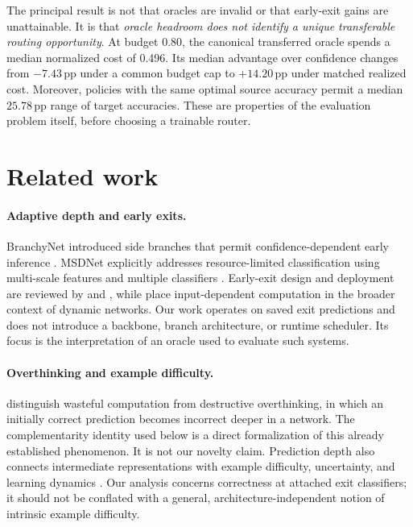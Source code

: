 \documentclass[11pt,a4paper]{article}
\newcommand{\pp}{\,\mathrm{pp}}
\begin{document}
The principal result is not that oracles are invalid or that early-exit gains are unattainable. It is that \emph{oracle headroom does not identify a unique transferable routing opportunity}. At budget 0.80, the canonical transferred oracle spends a median normalized cost of 0.496. Its median advantage over confidence changes from $-7.43\pp$ under a common budget cap to $+14.20\pp$ under matched realized cost. Moreover, policies with the same optimal source accuracy permit a median $25.78\pp$ range of target accuracies. These are properties of the evaluation problem itself, before choosing a trainable router.

\section{Related work}
\paragraph{Adaptive depth and early exits.}
BranchyNet introduced side branches that permit confidence-dependent early inference \citep{branchynet}. MSDNet explicitly addresses resource-limited classification using multi-scale features and multiple classifiers \citep{msdnet}. Early-exit design and deployment are reviewed by \citet{adaptive} and \citet{survey}, while \citet{dynamic} place input-dependent computation in the broader context of dynamic networks. Our work operates on saved exit predictions and does not introduce a backbone, branch architecture, or runtime scheduler. Its focus is the interpretation of an oracle used to evaluate such systems.

\paragraph{Overthinking and example difficulty.}
\citet{overthinking} distinguish wasteful computation from destructive overthinking, in which an initially correct prediction becomes incorrect deeper in a network. The complementarity identity used below is a direct formalization of this already established phenomenon. It is not our novelty claim. Prediction depth also connects intermediate representations with example difficulty, uncertainty, and learning dynamics \citep{difficulty}. Our analysis concerns correctness at attached exit classifiers; it should not be conflated with a general, architecture-independent notion of intrinsic example difficulty.
\end{document}
